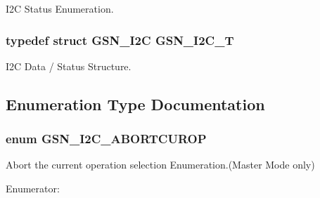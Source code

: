I2C Status Enumeration. 

\hypertarget{a00649_gae64c71a450a11f2589a7e359f15fca3a}{
\subsubsection[{GSN\_\-I2C\_\-T}]{\setlength{\rightskip}{0pt plus 5cm}typedef struct {\bf GSN\_\-I2C}  {\bf GSN\_\-I2C\_\-T}}}
\label{a00649_gae64c71a450a11f2589a7e359f15fca3a}


I2C Data / Status Structure. 



\subsection{Enumeration Type Documentation}
\hypertarget{a00649_ga2ed0e9ed554e26759140e9afffd51eb4}{
\subsubsection[{GSN\_\-I2C\_\-ABORTCUROP}]{\setlength{\rightskip}{0pt plus 5cm}enum {\bf GSN\_\-I2C\_\-ABORTCUROP}}}
\label{a00649_ga2ed0e9ed554e26759140e9afffd51eb4}


Abort the current operation selection Enumeration.(Master Mode only) 

\begin{Desc}
\item[Enumerator: ]\par
\begin{description}
\item[{\em 
\hypertarget{a00649_gga2ed0e9ed554e26759140e9afffd51eb4ac5cf33d09a8a21ee470a61827adee434}{
GSN\_\-I2C\_\-AbortCurOp\_\-reset}
\label{a00649_gga2ed0e9ed554e26759140e9afffd51eb4ac5cf33d09a8a21ee470a61827adee434}
}]\item[{\em 
\hypertarget{a00649_gga2ed0e9ed554e26759140e9afffd51eb4af3c6cf457cfa893024d5cd527fe834ea}{
GSN\_\-I2C\_\-AbortCurOp\_\-set}
\label{a00649_gga2ed0e9ed554e26759140e9afffd51eb4af3c6cf457cfa893024d5cd527fe834ea}
}]\end{description}
\end{Desc}



